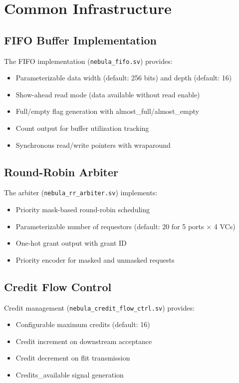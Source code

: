 \documentclass[12pt,letterpaper]{article}
\begin{document}
\section{Common Infrastructure}

\subsection{FIFO Buffer Implementation}

The FIFO implementation (\texttt{nebula\_fifo.sv}) provides:

\begin{itemize}
    \item Parameterizable data width (default: 256 bits) and depth (default: 16)
    \item Show-ahead read mode (data available without read enable)
    \item Full/empty flag generation with almost\_full/almost\_empty
    \item Count output for buffer utilization tracking
    \item Synchronous read/write pointers with wraparound
\end{itemize}

\subsection{Round-Robin Arbiter}

The arbiter (\texttt{nebula\_rr\_arbiter.sv}) implements:

\begin{itemize}
    \item Priority mask-based round-robin scheduling
    \item Parameterizable number of requestors (default: 20 for 5 ports × 4 VCs)
    \item One-hot grant output with grant ID
    \item Priority encoder for masked and unmasked requests
\end{itemize}

\subsection{Credit Flow Control}

Credit management (\texttt{nebula\_credit\_flow\_ctrl.sv}) provides:

\begin{itemize}
    \item Configurable maximum credits (default: 16)
    \item Credit increment on downstream acceptance
    \item Credit decrement on flit transmission
    \item Credits\_available signal generation
\end{itemize}
\end{document}
